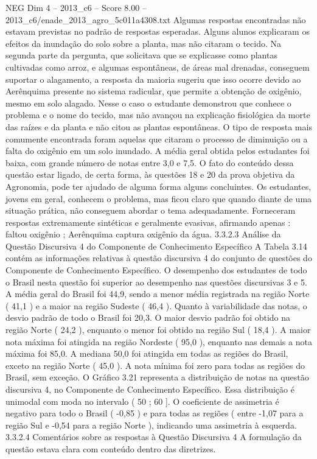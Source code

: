 \begin{textsample}{NEG Dim 4 – 2013\_c6 – Score 8.00 – 2013\_c6/enade\_2013\_agro\_5c011a4308.txt}
Algumas respostas encontradas não estavam previstas no padrão de respostas esperadas.
Alguns alunos explicaram os efeitos da inundação do solo sobre a planta, mas não citaram o tecido.
Na segunda parte da pergunta, que solicitava que se explicasse como plantas cultivadas como arroz, e algumas espontâneas, de áreas mal drenadas, conseguem suportar o alagamento, a resposta da maioria sugeriu que isso ocorre devido ao Aerênquima presente no sistema radicular, que permite a obtenção de oxigênio, mesmo em solo alagado.
Nesse o caso o estudante demonstrou que conhece o problema e o nome do tecido, mas não avançou na explicação fisiológica da morte das raízes e da planta e não citou as plantas espontâneas.
O tipo de resposta mais comumente encontrada foram aquelas que citaram o processo de diminuição ou a falta do oxigênio em um solo inundado.
A média geral obtida pelos estudantes foi baixa, com grande número de notas entre 3,0 e 7,5.
O fato do conteúdo dessa questão estar ligado, de certa forma, às questões 18 e 20 da prova objetiva da Agronomia, pode ter ajudado de alguma forma alguns concluintes.
Os estudantes, jovens em geral, conhecem o problema, mas ficou claro que quando diante de uma situação prática, não conseguem abordar o tema adequadamente.
Forneceram respostas extremamente sintéticas e geralmente evasivas, afirmando apenas : faltou oxigênio ; Aerênquima captura oxigênio da água. 3.3.2.3 Análise da Questão Discursiva 4 do Componente de Conhecimento Específico A Tabela 3.14 contém as informações relativas à questão discursiva 4 do conjunto de questões do Componente de Conhecimento Específico.
O desempenho dos estudantes de todo o Brasil nesta questão foi superior ao desempenho nas questões discursivas 3 e 5.
A média geral do Brasil foi 44,9, sendo a menor média registrada na região Norte ( 41,1 ) e a maior na região Sudeste ( 46,4 ).
Quanto à variabilidade das notas, o desvio padrão de todo o Brasil foi 20,3.
O maior desvio padrão foi obtido na região Norte ( 24,2 ), enquanto o menor foi obtido na região Sul ( 18,4 ).
A maior nota máxima foi atingida na região Nordeste ( 95,0 ), enquanto nas demais a nota máxima foi 85,0.
A mediana 50,0 foi atingida em todas as regiões do Brasil, exceto na região Norte ( 45,0 ).
A nota mínima foi zero para todas as regiões do Brasil, sem exceção.
O Gráfico 3.21 representa a distribuição de notas na questão discursiva 4, no Componente de Conhecimento Específico.
Essa distribuição é unimodal com moda no intervalo ( 50 ; 60 ].
O coeficiente de assimetria é negativo para todo o Brasil ( -0,85 ) e para todas as regiões ( entre -1,07 para a região Sul e -0,54 para a região Norte ), indicando uma assimetria à esquerda. 3.3.2.4 Comentários sobre as respostas à Questão Discursiva 4 A formulação da questão estava clara com conteúdo dentro das diretrizes.

\end{textsample}
